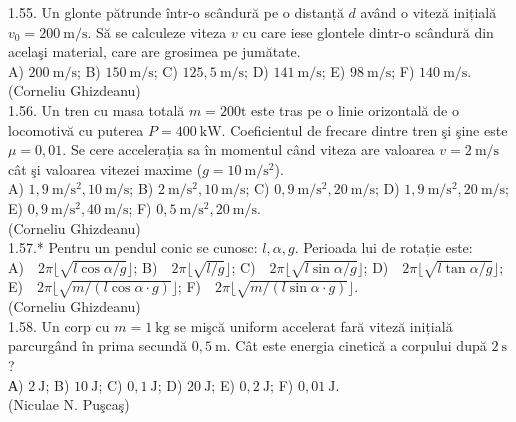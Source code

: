 \documentclass[10pt]{article}
\begin{document}
1.55. Un glonte pătrunde într-o scândură pe o distanță $d$ având o viteză inițială $v_{0}=200 \mathrm{~m} / \mathrm{s}$. Să se calculeze viteza $v$ cu care iese glontele dintr-o scândură din acelaşi material, care are grosimea pe jumătate.\\ A) $200 \mathrm{~m} / \mathrm{s}$; B) $150 \mathrm{~m} / \mathrm{s}$; C) $125,5 \mathrm{~m} / \mathrm{s}$; D) $141 \mathrm{~m} / \mathrm{s}$; E) $98 \mathrm{~m} / \mathrm{s}$; F) $140 \mathrm{~m} / \mathrm{s}$.\\ (Corneliu Ghizdeanu)\\

1.56. Un tren cu masa totală $m=200 \mathrm{t}$ este tras pe o linie orizontală de o locomotivă cu puterea $P=400 \mathrm{~kW}$. Coeficientul de frecare dintre tren şi şine este $\mu=0,01$. Se cere accelerația sa în momentul când viteza are valoarea $v=2 \mathrm{~m} / \mathrm{s}$ cât şi valoarea vitezei maxime ($g=10 \mathrm{~m} / \mathrm{s}^{2}$).\\ A) $1,9 \mathrm{~m} / \mathrm{s}^{2}, 10 \mathrm{~m} / \mathrm{s}$; B) $2 \mathrm{~m} / \mathrm{s}^{2}, 10 \mathrm{~m} / \mathrm{s}$; C) $0,9 \mathrm{~m} / \mathrm{s}^{2}, 20 \mathrm{~m} / \mathrm{s}$; D) $1,9 \mathrm{~m} / \mathrm{s}^{2}, 20 \mathrm{~m} / \mathrm{s}$; E) $0,9 \mathrm{~m} / \mathrm{s}^{2}, 40 \mathrm{~m} / \mathrm{s}$; F) $0,5 \mathrm{~m} / \mathrm{s}^{2}, 20 \mathrm{~m} / \mathrm{s}$.\\ (Corneliu Ghizdeanu)\\

1.57.* Pentru un pendul conic se cunosc: $l, \alpha, g$. Perioada lui de rotație este:\\ A) $2\pi \lfloor \sqrt{l \cos \alpha / g} \rfloor$; B) $2\pi \lfloor \sqrt{l / g} \rfloor$; C) $2\pi \lfloor \sqrt{l \sin \alpha / g} \rfloor$; D) $2\pi \lfloor \sqrt{l \tan \alpha / g} \rfloor$; E) $2\pi \lfloor \sqrt{m / (l \cos \alpha \cdot g)} \rfloor$; F) $2\pi \lfloor \sqrt{m / (l \sin \alpha \cdot g)} \rfloor$.\\ (Corneliu Ghizdeanu)\\

1.58. Un corp cu $m=1 \mathrm{~kg}$ se mişcă uniform accelerat fară viteză inițială parcurgând în prima secundă $0,5 \mathrm{~m}$. Cât este energia cinetică a corpului după $2 \mathrm{~s}$?\\ А) $2 \mathrm{~J}$; B) $10 \mathrm{~J}$; C) $0,1 \mathrm{~J}$; D) $20 \mathrm{~J}$; E) $0,2 \mathrm{~J}$; F) $0,01 \mathrm{~J}$.\\ (Niculae N. Puşcaş)\\
\end{document}
